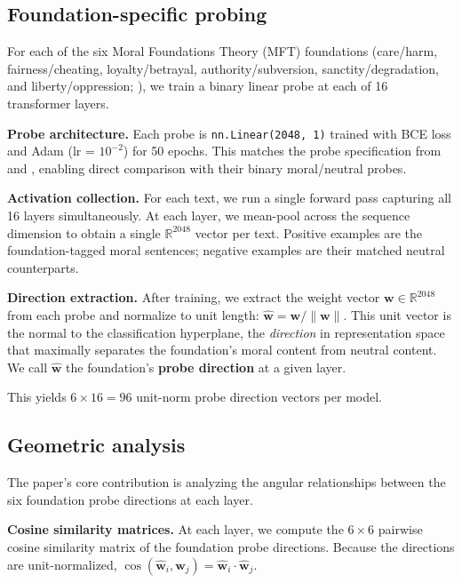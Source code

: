 \subsection{Foundation-specific probing}\label{foundation-specific-probing}

For each of the six Moral Foundations Theory (MFT) foundations
(care/harm, fairness/cheating, loyalty/betrayal, authority/subversion,
sanctity/degradation, and liberty/oppression;
\citep{haidt2012righteous, graham2013mft}), we train a binary
linear probe at each of 16 transformer layers.

\textbf{Probe architecture.} Each probe is \texttt{nn.Linear(2048,\ 1)} trained
with BCE loss and Adam (lr = \(10^{-2}\)) for 50 epochs. This
matches the probe specification from
\citet{reblitzrichardson2026fragility} and
\citet{reblitzrichardson2026dilution}, enabling direct comparison
with their binary moral/neutral probes.

\textbf{Activation collection.} For each text, we run a single forward
pass capturing all 16 layers simultaneously. At each layer, we
mean-pool across the sequence dimension to obtain a single
\(\mathbb{R}^{2048}\) vector per text. Positive examples are the
foundation-tagged moral sentences; negative examples are their
matched neutral counterparts.

\textbf{Direction extraction.} After training, we extract the weight
vector \(\mathbf{w} \in \mathbb{R}^{2048}\) from each probe and
normalize to unit length: \(\hat{\mathbf{w}} = \mathbf{w} /
\|\mathbf{w}\|\). This unit vector is the normal to the
classification hyperplane, the \emph{direction} in representation
space that maximally separates the foundation's moral content from
neutral content. We call \(\hat{\mathbf{w}}\) the foundation's
\textbf{probe direction} at a given layer.

This yields \(6 \times 16 = 96\) unit-norm probe direction vectors
per model.

\subsection{Geometric analysis}\label{geometric-analysis}

The paper's core contribution is analyzing the angular relationships
between the six foundation probe directions at each layer.

\textbf{Cosine similarity matrices.} At each layer, we compute the
\(6 \times 6\) pairwise cosine similarity matrix of the foundation
probe directions. Because the directions are unit-normalized,
\(\cos(\hat{\mathbf{w}}_i, \hat{\mathbf{w}}_j) =
\hat{\mathbf{w}}_i \cdot \hat{\mathbf{w}}_j\).

